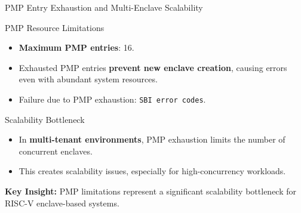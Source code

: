 \documentclass[aspectratio=169]{beamer}
\begin{document}
\begin{frame}{PMP Entry Exhaustion and Multi-Enclave Scalability}
\small
\begin{block}{PMP Resource Limitations}
\begin{itemize}
    \item \textbf{Maximum PMP entries}: 16.
    \item Exhausted PMP entries \textbf{prevent new enclave creation}, causing errors even with abundant system resources.
    \item Failure due to PMP exhaustion: \texttt{SBI error codes}.
\end{itemize}
\end{block}

\begin{block}{Scalability Bottleneck}
\begin{itemize}
    \item In \textbf{multi-tenant environments}, PMP exhaustion limits the number of concurrent enclaves.
    \item This creates scalability issues, especially for high-concurrency workloads.
\end{itemize}
\end{block}

\centering
\textbf{Key Insight:} PMP limitations represent a significant scalability bottleneck for RISC-V enclave-based systems.
\end{frame}



\end{document}
